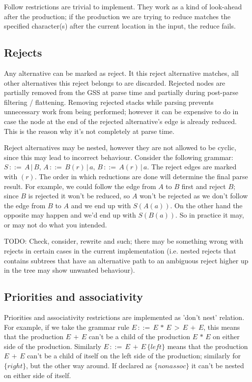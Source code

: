 \documentclass[a4paper,10pt]{article}
\begin{document}
Follow restrictions are trivial to implement. They work as a kind of look-ahead after the production; if the production we are trying to reduce matches the specified character(s) after the current location in the input, the reduce fails.

\subsection{Rejects}

Any alternative can be marked as reject. It this reject alternative matches, all other alternatives this reject belongs to are discarded. Rejected nodes are partially removed from the GSS at parse time and partially during post-parse filtering / flattening. Removing rejected stacks while parsing prevents unnecessary work from being performed; however it can be expensive to do in case the node at the end of the rejected alternative's edge is already reduced. This is the reason why it's not completely at parse time.

Reject alternatives may be nested, however they are not allowed to be cyclic, since this may lead to incorrect behaviour. Consider the following grammar: $S\,::=\,A\,|\,B,\,A\,::=\,B(r)\,|\,a,\,B\,::=\,A(r)\,|\,a$. The reject edges are marked with $(r)$. The order in which reductions are done will determine the final parse result. For example, we could follow the edge from $A$ to $B$ first and reject $B$; since $B$ is rejected it won't be reduced, so $A$ won't be rejected as we don't follow the edge from $B$ to $A$ and we end up with $S(A(a))$. On the other hand the opposite may happen and we'd end up with $S(B(a))$. So in practice it may, or may not do what you intended.

TODO: Check, consider, rewrite and such; there may be something wrong with rejects in certain cases in the current implementation (i.e. nested rejects that contains subtrees that have an alternative path to an ambiguous reject higher up in the tree may show unwanted behaviour).

\subsection{Priorities and associativity}

Priorities and associativity restrictions are implemented as 'don't nest' relation. For example, if we take the grammar rule $E\,::=\,E\,*\,E\,>\,E\,+\,E$, this means that the production $E\,+\,E$ can't be a child of the production $E\,*\,E$ on either side of the production. Similarly $E\,::=\,E\,+\,E\,\{left\}$ means that the production $E\,+\,E$ can't be a child of itself on the left side of the production; similarly for $\{right\}$, but the other way around. If declared as $\{nonassoc\}$ it can't be nested on either side of itself.
\end{document}
